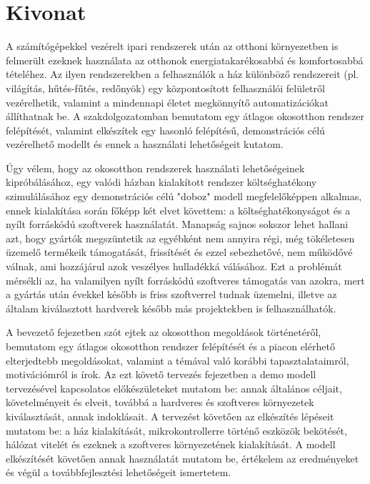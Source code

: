 \setcounter{page}{1}

\selecthungarian

\chapter*{Kivonat}

A számítógépekkel vezérelt ipari rendszerek után az otthoni környezetben is felmerült ezeknek használata az otthonok energiatakarékosabbá és komfortosabbá tételéhez. Az ilyen rendszerekben a felhasználók a ház különböző rendszereit (pl. világítás, hűtés-fűtés, redőnyök) egy központosított felhasználói felületről vezérelhetik, valamint a mindennapi életet megkönnyítő automatizációkat állíthatnak be. A szakdolgozatomban bemutatom egy átlagos okosotthon rendszer felépítését, valamint elkészítek egy hasonló felépítésű, demonstrációs célú vezérelhető modellt és ennek a használati lehetőségeit kutatom.
\newline

Úgy vélem, hogy az okosotthon rendszerek használati lehetőségeinek kipróbálásához, egy valódi házban kialakított rendszer költséghatékony szimulálásához egy demonstrációs célú "doboz" modell megfelelőképpen alkalmas, ennek kialakítása során főképp két elvet követtem: a költséghatékonyságot és a nyílt forráskódú szoftverek használatát. Manapság sajnos sokszor lehet hallani azt, hogy gyártók megszüntetik az egyébként nem annyira régi, még tökéletesen üzemelő termékeik támogatását, frissítését és ezzel sebezhetővé, nem működővé válnak, ami hozzájárul azok veszélyes hulladékká válásához. Ezt a problémát mérsékli az, ha valamilyen nyílt forráskódú szoftveres támogatás van azokra, mert a gyártás után évekkel később is friss szoftverrel tudnak üzemelni, illetve az általam kiválasztott hardverek később más projektekben is felhasználhatók.
\newline

A bevezető fejezetben szót ejtek az okosotthon megoldások történetéről, bemutatom egy átlagos okosotthon rendszer felépítését és a piacon elérhető elterjedtebb megoldásokat, valamint a témával való korábbi tapasztalataimról, motivációmról is írok. Az ezt követő tervezés fejezetben a demo modell tervezésével kapcsolatos előkészületeket mutatom be: annak általános céljait, követelményeit és elveit, továbbá a hardveres és szoftveres környezetek kiválasztását, annak indoklásait. A tervezést követően az elkészítés lépéseit mutatom be: a ház kialakítását, mikrokontrollerre történő eszközök bekötését, hálózat vitelét és ezeknek a szoftveres környezetének kialakítását. A modell elkészítését követően annak használatát mutatom be, értékelem az eredményeket és végül a továbbfejlesztési lehetőségeit ismertetem.



